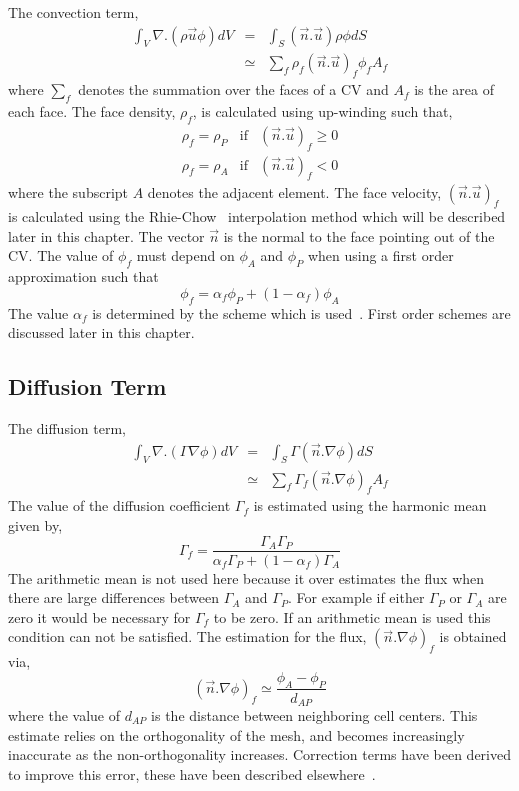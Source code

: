 The convection term,
\begin{eqnarray}
\int_V \nabla.(\rho \vec{u} \phi) dV & = & \int_S (\vec{n}.\vec{u})\rho\phi dS \\
& \simeq & \sum_{f} \rho_f (\vec{n}.\vec{u})_f \phi_f A_f
\label{eqn:num:con}
\end{eqnarray}
where $\sum_{f}$ denotes the summation over the faces of a CV and $A_f$ is
the area of each face.
The face density, $\rho_f$, is calculated using up-winding such that,
\begin{eqnarray}
\rho_f=\rho_P & \mbox{if} & (\vec{n}.\vec{u})_f \ge 0 \\
\rho_f=\rho_A & \mbox{if} & (\vec{n}.\vec{u})_f < 0 
\end{eqnarray}
where the subscript $A$ denotes the adjacent element.
The face velocity, $(\vec{n}.\vec{u})_f$ is calculated using the
Rhie-Chow~\cite{rhie}
interpolation method which will be described later in this chapter. The
vector $\vec{n}$ is the normal to the face pointing out of the CV.
The value of $\phi_f$ must depend on $\phi_A$ and $\phi_P$ when using
a first order approximation such that 
\begin{equation}
\phi_f=\alpha_f \phi_P +(1-\alpha_f)\phi_A
\end{equation}
The value $\alpha_f$ is determined by the scheme which is used~\cite{croftphd}.
First order schemes are discussed later in this chapter.

\subsection{Diffusion Term}

The diffusion term,
\begin{eqnarray}
\int_V \nabla.(\Gamma\nabla\phi) dV & = & \int_S \Gamma (\vec{n}.\nabla\phi) dS \\
& \simeq & \sum_f \Gamma_f (\vec{n}.\nabla\phi)_f A_f
\label{eqn:num:dif}
\end{eqnarray}
The value of the diffusion coefficient $\Gamma_f$ is estimated using
the harmonic mean~\cite{patankar}
given by,
\begin{equation}
\Gamma_f = \frac{\Gamma_A\Gamma_P}{\alpha_f \Gamma_P + (1-\alpha_f) \Gamma_A}
\end{equation}
The arithmetic mean is not used here because it over estimates the flux
when there are large differences between $\Gamma_A$ and $\Gamma_P$.
For example if either $\Gamma_P$ or $\Gamma_A$ are zero it
would be necessary for $\Gamma_f$ to be zero. If an arithmetic mean
is used this condition can not be satisfied.
The estimation for the flux, $(\vec{n}.\nabla\phi)_f$ is obtained via,
\begin{equation}
(\vec{n}.\nabla\phi)_f \simeq \frac{\phi_A-\phi_P}{d_{AP}}
\end{equation}
where the value of $d_{AP}$ is the distance between neighboring cell centers.
This estimate relies on the orthogonality of the mesh, and becomes
increasingly inaccurate as the non-orthogonality increases. Correction terms
have been derived to improve this error, these have been described
elsewhere~\cite{croftphd}.

